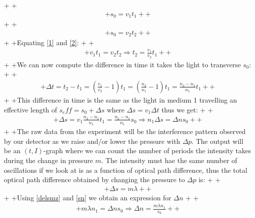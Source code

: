 +
+\begin{align}
+s_0=v_1 t_1
+\label{1}
+\end{align}
+
+\begin{align}
+s_0 = v_2 t_2
+\label{2}
+\end{align}
+
+Equating \ref{1} and \ref{2}:
+
+\begin{align}
+v_1 t_1 = v_2 t_2 \Rightarrow t_2 = \frac{v_1}{v_2}t_1
+\label{t2}
+\end{align}
+
+We can now compute the difference in time it takes the light to transverse $s_0$:
+
+\begin{align}
+\Delta t = t_2-t_1 = (\frac{v_1}{v_2}-1)t_1 = (\frac{n_2}{n_1}-1)t_1=\frac{n_2-n_1}{n_1}t_1
+\label{deltat}
+\end{align}
+
+This difference in time is the same as the light in medium 1 travelling an effective length of $s_eff=s_0+\Delta s$ where $\Delta s = v_1 \Delta t$ thus we get:
+
+\begin{align}
+\Delta s = v_1\frac{n_2-n_1}{n_1}t_1=\frac{n_2-n_1}{n_1}s_0 \Rightarrow n_1\Delta s = \Delta n s_0
+\label{sn}
+\end{align}
+
+The raw data from the experiment will be the interference pattern observed by our detector as we raise and/or lower the pressure with $\Delta p$. The output will be an $(t,I)$-graph where we can count the number of periods the intensity takes during the change in pressure $m$. The intensity must hae the same number of oscillations if we look at is as a function of optical path difference, thus the total optical path difference obtained by changing the pressure to $\Delta p$ is:
+
+\begin{align}
+\Delta s = m\lambda
+\label{delsmz}
+\end{align}
+
+Using \ref{delsmz} and \ref{sn} we obtain an expression for $\Delta n$
+
+\begin{align}
+m\lambda n_1 = \Delta n s_0 \Rightarrow \Delta n = \frac{m \lambda n_1}{s_0}
+\label{deln}
+\end{align}

